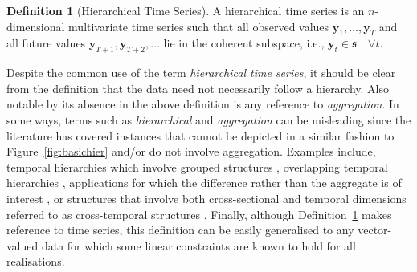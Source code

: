 \documentclass[12pt]{article}
\theoremstyle{definition}
\newtheorem{definition}{Definition}[section]
\begin{document}
\begin{definition}[Hierarchical Time Series]\label{def:hts}
   A hierarchical time series is an $n$-dimensional multivariate time series such that all observed values $\bm{y}_1,\ldots,\bm{y}_T$ and all future values $\bm{y}_{T+1},\bm{y}_{T+2},\ldots$ lie in the coherent subspace, i.e., $\bm{y}_t\in\mathfrak{s}\quad\forall t$.
\end{definition}

Despite the common use of the term \emph{hierarchical time series}, it should be clear from the definition that the data need not necessarily follow a hierarchy. Also notable by its absence in the above definition is any reference to \emph{aggregation}. In some ways, terms such as \emph{hierarchical} and \emph{aggregation} can be misleading since the literature has covered instances that cannot be depicted in a similar fashion to Figure~\ref{fig:basichier} and/or do not involve aggregation. Examples include, temporal hierarchies which involve grouped structures \citep[see][]{AthEtAl2017}, overlapping temporal hierarchies \citep[see][]{JeoEtAl2019}, applications for which the difference rather than the aggregate is of interest \cite[see][]{LiTan2019}, or structures that involve both cross-sectional and temporal dimensions referred to as cross-temporal structures \citep[see][]{KouAth2019}. Finally, although Definition~\ref{def:hts} makes reference to time series, this definition can be easily generalised to any vector-valued data for which some linear constraints are known to hold for all realisations.

%
\end{document}
